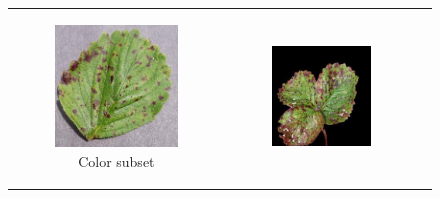 \documentclass{BachelorBUI}
\begin{document}
        \begin{figure}[!h]
            \centering
            \begin{tabular}{ccc}
                \begin{subfigure}[t]{0.30\textwidth}
                    \centering
                    \includegraphics[width=\textwidth]{color_strawberry_leaf_scorch.JPG}
                    \caption{\centering Color subset}
                \end{subfigure} &
                \begin{subfigure}[t]{0.30\textwidth}
                    \centering
                    \includegraphics[width=\textwidth]{segmented_strawberry_leaf_scorch.jpg}

\end{subfigure}
\end{tabular}
\end{figure}
\end{document}
